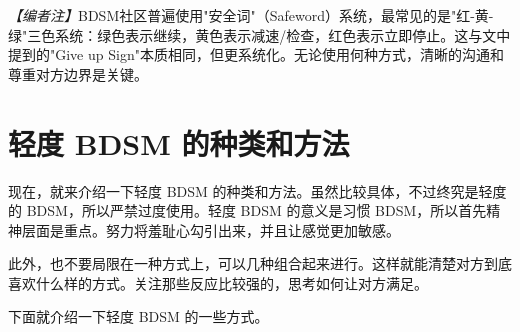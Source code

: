 \documentclass[12pt,UTF8]{ctexbook}
\begin{document}
\textit{【编者注】}BDSM社区普遍使用"安全词"（Safeword）系统，最常见的是"红-黄-绿"三色系统：绿色表示继续，黄色表示减速/检查，红色表示立即停止。这与文中提到的"Give up Sign"本质相同，但更系统化。无论使用何种方式，清晰的沟通和尊重对方边界是关键。

\section{轻度 BDSM 的种类和方法}

现在，就来介绍一下轻度 BDSM 的种类和方法。虽然比较具体，不过终究是轻度的 BDSM，所以严禁过度使用。轻度 BDSM 的意义是习惯 BDSM，所以首先精神层面是重点。努力将羞耻心勾引出来，并且让感觉更加敏感。

此外，也不要局限在一种方式上，可以几种组合起来进行。这样就能清楚对方到底喜欢什么样的方式。关注那些反应比较强的，思考如何让对方满足。

下面就介绍一下轻度 BDSM 的一些方式。
\end{document}

